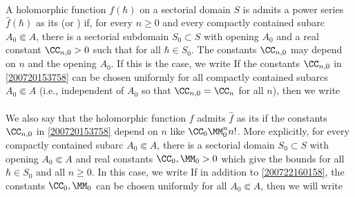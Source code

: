 \documentclass[11pt]{article}
\begin{document}
\begin{appendices}
\paragraph{}
A holomorphic function $f (\hbar)$ on a sectorial domain $S$ is admits a power series $\hat{f} (\hbar)$ as its  (or ) if, for every $n \geq 0$ and every compactly contained subarc $A_0 \Subset A$, there is a sectorial subdomain $S_0 \subset S$ with opening $A_0$ and a real constant $\CC_{n,0} > 0$ such that
for all $\hbar \in S_0$.
The constants $\CC_{n,0}$ may depend on $n$ and the opening $A_0$.
If this is the case, we write
\vspace{-7.5pt}
If the constants $\CC_{n,0}$ in \eqref{200720153758} can be chosen uniformly for all compactly contained subarcs $A_0 \Subset A$ (i.e., independent of $A_0$ so that $\CC_{n,0} = \CC_n$ for all $n$), then we write

\paragraph{}
We also say that the holomorphic function $f$ admits $\hat{f}$ as its  if the constants $\CC_{n,0}$ in \eqref{200720153758} depend on $n$ like $\CC_0 \MM_0^n n!$.
More explicitly, for every compactly contained subarc $A_0 \Subset A$, there is a sectorial domain $S_0 \subset S$ with opening $A_0 \Subset A$ and real constants $\CC_0, \MM_0 > 0$ which give the bounds
for all $\hbar \in S_0$ and all $n \geq 0$.
In this case, we write
If in addition to \eqref{200722160158}, the constants $\CC_0, \MM_0$ can be chosen uniformly for all $A_0 \Subset A$, then we will write
\vspace{-5pt}


\end{appendices}
\end{document}
